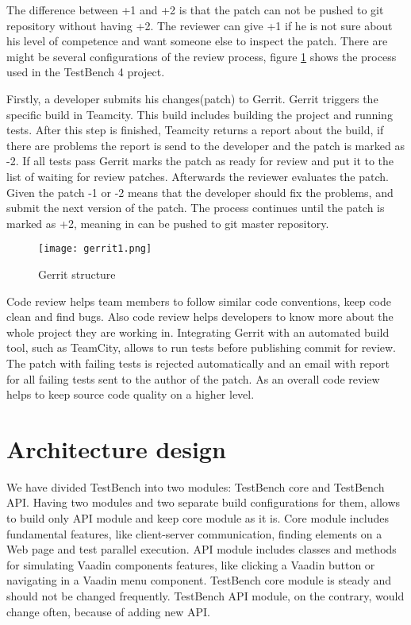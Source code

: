   The difference between +1 and +2 is that the patch can not be pushed to git
  repository without having +2. The reviewer can give +1 if he is not sure about 
  his level of competence  and want someone else to inspect the patch. 
  There are might be several configurations of the review process,
  figure \ref{fig:gerritTestbench} shows the process used in the
  TestBench 4 project.

  Firstly, a developer submits his changes(patch) to Gerrit. Gerrit triggers the
  specific build in Teamcity. This build includes building the project and
  running tests. After this step is finished, Teamcity returns a report about the build,
  if there are problems the report is send to the developer and the patch is marked as -2. If all
  tests pass Gerrit marks the patch as ready for review and put it to the list
  of waiting for review patches.
  Afterwards the reviewer evaluates the patch. Given the patch -1 or -2 means
  that the developer should fix the problems, and submit the next version of the patch. 
  The process continues until the patch is marked as +2,
    meaning in can be pushed to git master repository.
    \begin{figure}
    \centering
      \texttt{[image: gerrit1.png]}
      \caption{Gerrit structure}
      \label{fig:gerritTestbench}
    \end{figure}
    
  Code review helps team members to follow similar code conventions, 
  keep code clean and find bugs. Also code review helps developers to know more about 
  the whole project they are working in. Integrating Gerrit with an automated build tool, 
  such as TeamCity, allows to run tests before publishing commit for review. 
  The patch with failing tests is rejected automatically and an email with report
   for all failing tests sent to the author of the patch. 
   As an overall code review helps to keep source code quality on a higher level.

  \section{Architecture design}
   
   We have divided TestBench into two modules: TestBench core and TestBench API. Having
two modules and two separate build configurations for them, allows to build only
API module and keep core module as it is. Core module includes fundamental features,
 like client-server communication, finding
elements on a Web page and test parallel execution. API module includes
classes and methods for simulating Vaadin components features, like clicking a
Vaadin button or navigating in a Vaadin menu component. TestBench core
module is steady and should not be changed frequently. TestBench API
module, on the contrary, would change often, because of adding new API.

